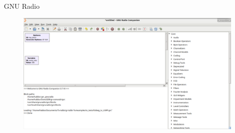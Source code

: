 \begin{frame}{GNU Radio}
	\begin{figure}
	\includegraphics[scale=0.22]{grc}
	\end{figure}
\end{frame}

